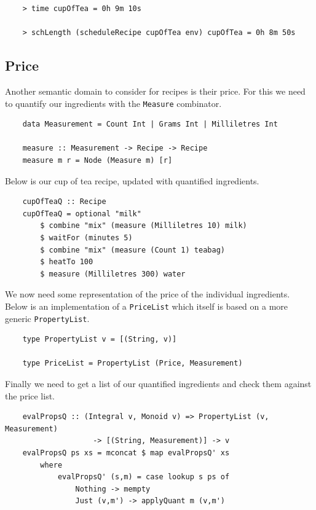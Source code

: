 \documentclass[11pt]{article}
\begin{document}
\begin{lstlisting}
    > time cupOfTea = 0h 9m 10s

    > schLength (scheduleRecipe cupOfTea env) cupOfTea = 0h 8m 50s
\end{lstlisting}

\subsection{Price}

Another semantic domain to consider for recipes is their price. For this we
need to quantify our ingredients with the \texttt{Measure} combinator.

\begin{lstlisting}
    data Measurement = Count Int | Grams Int | Milliletres Int

    measure :: Measurement -> Recipe -> Recipe
    measure m r = Node (Measure m) [r]
\end{lstlisting}

Below is our cup of tea recipe, updated with quantified ingredients.

\begin{lstlisting}
    cupOfTeaQ :: Recipe
    cupOfTeaQ = optional "milk"
        $ combine "mix" (measure (Milliletres 10) milk)
        $ waitFor (minutes 5)
        $ combine "mix" (measure (Count 1) teabag)
        $ heatTo 100
        $ measure (Milliletres 300) water
\end{lstlisting}

We now need some representation of the price of the individual ingredients.
Below is an implementation of a \texttt{PriceList} which itself is based on
a more generic \texttt{PropertyList}.

\begin{lstlisting}
    type PropertyList v = [(String, v)]

    type PriceList = PropertyList (Price, Measurement)
\end{lstlisting}

Finally we need to get a list of our quantified ingredients and check them
against the price list.

\begin{lstlisting}
    evalPropsQ :: (Integral v, Monoid v) => PropertyList (v, Measurement)
                    -> [(String, Measurement)] -> v
    evalPropsQ ps xs = mconcat $ map evalPropsQ' xs
        where
            evalPropsQ' (s,m) = case lookup s ps of
                Nothing -> mempty
                Just (v,m') -> applyQuant m (v,m')
\end{lstlisting}
\end{document}
